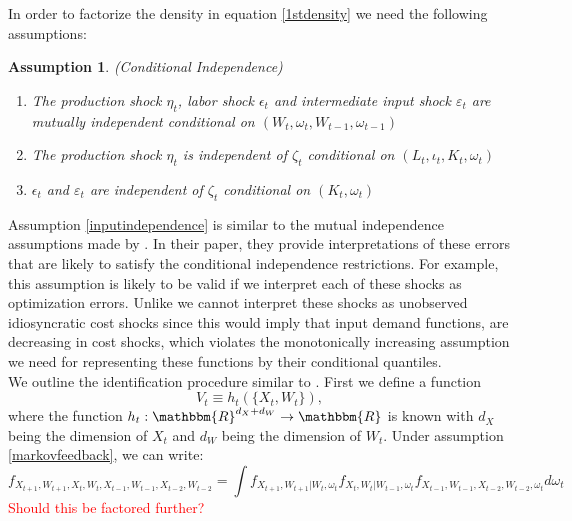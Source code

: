\documentclass{article}
\newtheorem{assump}{Assumption}[section]
\begin{document}
In order to factorize the density in equation \eqref{1stdensity} we need the following assumptions:
\begin{assump}(Conditional Independence)\label{inputindependence}
~
    \begin{enumerate}[label=\alph*)]
        \item The production shock $\eta_{t}$, labor shock $\epsilon_{t}$ and intermediate input shock $\varepsilon_{t}$ are mutually independent conditional on $(W_{t}, \omega_{t}, W_{t-1}, \omega_{t-1})$
        \item The production shock $\eta_{t}$ is independent of $\zeta_{t}$ conditional on $(L_{t}, \iota_{t}, K_{t}, \omega_{t})$
        \item $\epsilon_{t}$ and $\varepsilon_{t}$ are independent of $\zeta_{t}$ conditional on $(K_{t}, \omega_{t})$
    \end{enumerate}
\end{assump}
Assumption \eqref{inputindependence} is similar to the mutual independence assumptions made by \cite{Hu2019}. In their paper, they provide interpretations of these errors that are likely to satisfy the conditional independence restrictions. For example, this assumption is likely to be valid if we interpret each of these shocks as optimization errors. Unlike \cite{Hu2019} we cannot interpret these shocks as unobserved idiosyncratic cost shocks since this would imply that input demand functions, are decreasing in cost shocks, which violates the monotonically increasing assumption we need for representing these functions by their conditional quantiles.\\

We outline the identification procedure similar to \cite{Hu2012}. First we define a function
\begin{equation}\label{dimreduce}
V_{t}\equiv h_{t}(\{X_{t}, W_{t}\}),
\end{equation}
 where the function $h_{t}:\mathbbm{R}^{d_{X}+d_{W}}\rightarrow \mathbbm{R}$ is known with $d_{X}$ being the dimension of $X_{t}$ and $d_{W}$ being the dimension of $W_{t}$. Under assumption \eqref{markovfeedback}, we can write:
 \begin{equation}\label{obsdens}
 f_{X_{t+1}, W_{t+1}, X_{t}, W_{t}, X_{t-1}, W_{t-1}, X_{t-2}, W_{t-2}}=\int f_{X_{t+1},W_{t+1}|W_{t},\omega_{t}}f_{X_{t}, W_{t}|W_{t-1},\omega_{t}}f_{X_{t-1}, W_{t-1}, X_{t-2}, W_{t-2}, \omega_{t}}d\omega_{t}
 \end{equation}
 \textcolor{red}{Should this be factored further?}
\end{document}
